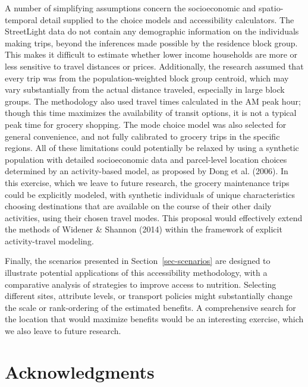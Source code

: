 \documentclass[
  letterpaper,
  number,
  review,
  3p]{elsarticle}
\begin{document}
A number of simplifying assumptions concern the socioeconomic and
spatio-temporal detail supplied to the choice models and accessibility
calculators. The StreetLight data do not contain any demographic
information on the individuals making trips, beyond the inferences made
possible by the residence block group. This makes it difficult to
estimate whether lower income households are more or less sensitive to
travel distances or prices. Additionally, the research assumed that
every trip was from the population-weighted block group centroid, which
may vary substantially from the actual distance traveled, especially in
large block groups. The methodology also used travel times calculated in
the AM peak hour; though this time maximizes the availability of transit
options, it is not a typical peak time for grocery shopping. The mode
choice model was also selected for general convenience, and not fully
calibrated to grocery trips in the specific regions. All of these
limitations could potentially be relaxed by using a synthetic population
with detailed socioeconomic data and parcel-level location choices
determined by an activity-based model, as proposed by Dong et al.
(2006). In this exercise, which we leave to future research, the grocery
maintenance trips could be explicitly modeled, with synthetic
individuals of unique characteristics choosing destinations that are
available on the course of their other daily activities, using their
chosen travel modes. This proposal would effectively extend the methods
of Widener \& Shannon (2014) within the framework of explicit
activity-travel modeling.

Finally, the scenarios presented in Section~\ref{sec-scenarios} are
designed to illustrate potential applications of this accessibility
methodology, with a comparative analysis of strategies to improve access
to nutrition. Selecting different sites, attribute levels, or transport
policies might substantially change the scale or rank-ordering of the
estimated benefits. A comprehensive search for the location that would
maximize benefits would be an interesting exercise, which we also leave
to future research.


\section*{Acknowledgments}\label{acknowledgments}

\end{document}
